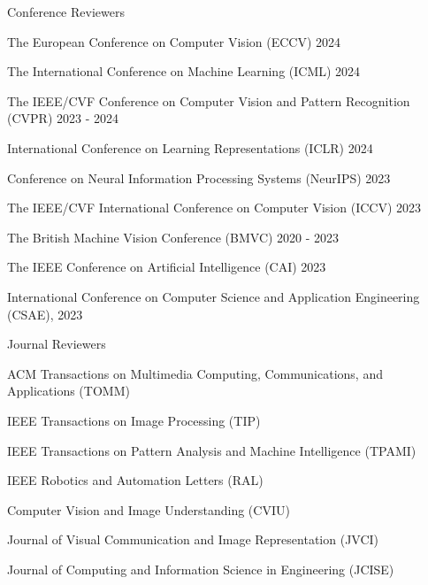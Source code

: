 


\begin{cventries}
\cvpub
{Conference Reviewers} %
{ %
\begin{cvitems}
    \item {The European Conference on Computer Vision  (ECCV) 2024}
    \item {The International Conference on Machine Learning (ICML) 2024}
    \item {The IEEE/CVF Conference on Computer Vision and Pattern Recognition (CVPR) 2023 - 2024}
    \item {International Conference on Learning Representations (ICLR) 2024}
    \item {Conference on Neural Information Processing Systems (NeurIPS) 2023}
    \item {The IEEE/CVF International Conference on Computer Vision (ICCV) 2023}
    \item {The British Machine Vision Conference (BMVC) 2020 - 2023}
    \item {The IEEE Conference on Artificial Intelligence (CAI) 2023}
    \item {International Conference on Computer Science and Application Engineering (CSAE), 2023}
\end{cvitems}
}

\vspace{-.5em}
\cvpub
{Journal Reviewers} %
{
\begin{cvitems}
    \item {ACM Transactions on Multimedia Computing, Communications, and Applications (TOMM)}
    \item {IEEE Transactions on Image Processing (TIP)}
    \item {IEEE Transactions on Pattern Analysis and Machine Intelligence (TPAMI)}
    \item {IEEE Robotics and Automation Letters (RAL)}
    \item {Computer Vision and Image Understanding (CVIU)}
    \item {Journal of Visual Communication and Image Representation (JVCI)}
    \item {Journal of Computing and Information Science in Engineering (JCISE)}
\end{cvitems}
}
\end{cventries}

